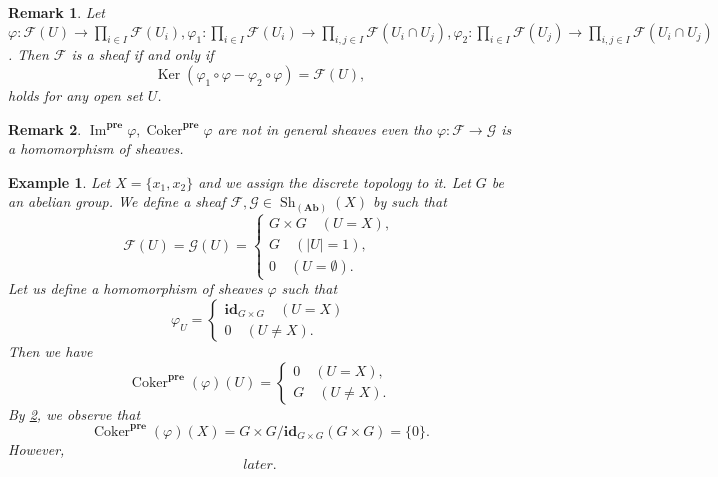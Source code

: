 \documentclass{article}
\newtheorem{remark}{Remark}[section]
\newtheorem{example}{Example}[section]
\numberwithin{equation}{section}
\DeclareMathOperator{\Sh}{Sh}
\DeclareMathOperator{\Ker}{Ker}
\DeclareMathOperator{\Image}{Im}
\DeclareMathOperator{\Coker}{Coker}
\begin{document}
\begin{remark}
Let $\varphi:\mathcal{F}(U)\to\prod_{i\in I}\mathcal{F}(U_i),\varphi_1:\prod_{i\in I}\mathcal{F}(U_i)\to\prod_{i,j\in I}\mathcal{F}(U_i\cap U_j),\varphi_2:\prod_{i\in I}\mathcal{F}(U_j)\to\prod_{i,j\in I}\mathcal{F}(U_i\cap U_j)$. Then $\mathcal{F}$ is a sheaf if and only if
\begin{equation*}
\Ker(\varphi_1\circ\varphi - \varphi_2\circ\varphi) = \mathcal{F}(U),
\end{equation*}
holds for any open set $U$.
\end{remark}

\begin{remark}
$\Image^{\mathbf{pre}}\varphi,\Coker^{\mathbf{pre}}\varphi$ are not in general sheaves even tho $\varphi:\mathcal{F}\to\mathcal{G}$ is a homomorphism of sheaves.
\label{sheaf_condition_kernel}
\end{remark}

\begin{example}
Let $X=\{x_1,x_2\}$ and we assign the discrete topology to it. Let $G$ be an abelian group. We define a sheaf $\mathcal{F},\mathcal{G}\in\Sh_{(\mathbf{Ab})}(X)$ by such that
\begin{equation*}
\mathcal{F}(U)=\mathcal{G}(U) = 
\begin{cases}
G\times G\quad (U=X),\\
G \quad (|U|=1),\\
0\quad (U=\emptyset).
\end{cases}
\end{equation*}
Let us define a homomorphism of sheaves $\varphi$ such that
\begin{equation*}
\varphi_U = 
\begin{cases}
\mathbf{id}_{G\times G}\quad (U=X)\\
0\quad (U\not= X).
\end{cases}
\end{equation*}
Then we have
\begin{equation*}
\Coker^{\mathbf{pre}}(\varphi)(U) = 
\begin{cases}
0\quad (U=X),\\
G\quad (U\not= X).
\end{cases}
\end{equation*}
By \ref{sheaf_condition_kernel}, we observe that
\begin{equation*}
\Coker^{\mathbf{pre}}(\varphi)(X)=G\times G/\mathbf{id}_{G\times G}(G\times G) = \{0\}.
\end{equation*}
However, 
\begin{equation*}
later.
\end{equation*}
\end{example}
\end{document}
